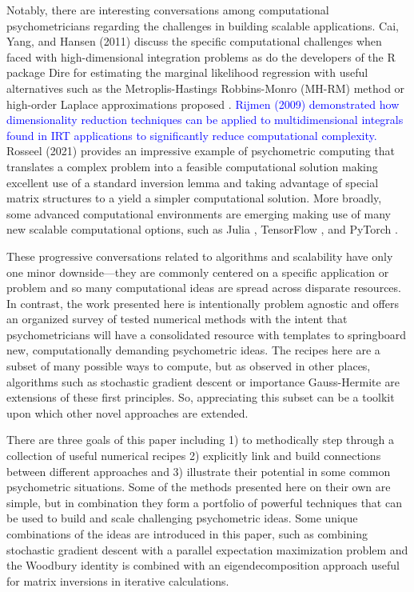 \documentclass[12pt]{article}
\begin{document}
Notably, there are interesting conversations among computational psychometricians regarding the challenges in building scalable applications. Cai, Yang, and Hansen (2011) discuss the specific computational challenges when faced with high-dimensional integration problems as do the developers of the R package Dire \cite{dire} for estimating the marginal likelihood regression \cite{mislevy} with useful alternatives such as the Metroplis-Hastings Robbins-Monro (MH-RM) method \cite{cai:fisher} or high-order Laplace approximations  proposed \cite{bjorn}. \textcolor{blue}{Rijmen (2009) demonstrated how dimensionality reduction techniques can be applied to multidimensional integrals found in IRT applications to significantly reduce computational complexity.} Rosseel (2021) provides an impressive example of psychometric computing that translates a complex problem into a feasible computational solution making excellent use of a standard inversion lemma and taking advantage of special matrix structures to a yield a simpler computational solution. More broadly, some advanced computational environments are emerging making use of many new scalable computational options, such as Julia \cite{Julia-2017}, TensorFlow \cite{tensorflow2015-whitepaper}, and PyTorch \cite{pytorch}. \nocite{cai} \nocite{psych3020017} \nocite{rijmen:2009}

These progressive conversations related to algorithms and scalability have only one minor downside---they are commonly centered on a specific application or problem and so many computational ideas are spread across disparate resources. In contrast, the work presented here is intentionally problem agnostic and offers an organized survey of tested numerical methods with the intent that psychometricians will have a consolidated resource with templates to springboard new, computationally demanding psychometric ideas. The recipes here are a subset of many possible ways to compute, but as observed in other places, algorithms such as stochastic gradient descent \cite{Toulis2015ScalableES} or importance Gauss-Hermite \cite{elvira} are extensions of these first principles. So, appreciating this subset can be a toolkit upon which other novel approaches are extended.

There are three goals of this paper including 1) to methodically step through a collection of useful numerical recipes 2) explicitly link and build connections between different approaches and 3) illustrate their potential in some common psychometric situations. Some of the methods presented here on their own are simple, but in combination they form a portfolio of powerful techniques that can be used to build and scale challenging psychometric ideas. Some unique combinations of the ideas are introduced in this paper, such as combining stochastic gradient descent with a parallel expectation maximization problem and the Woodbury identity is combined with an eigendecomposition approach useful for matrix inversions in iterative calculations. 
\end{document}
